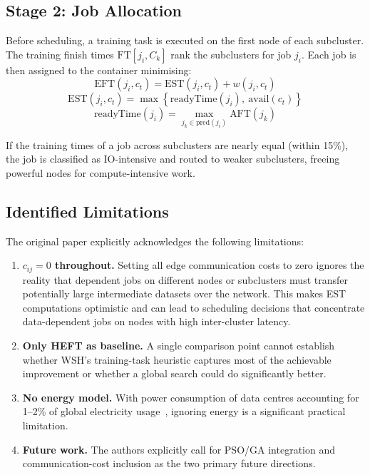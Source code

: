 \documentclass[10pt,twocolumn]{article}
\begin{document}
\subsection{Stage 2: Job Allocation}

Before scheduling, a training task is executed on the first node of each subcluster.
The training finish times $\text{FT}[j_i, C_k]$ rank the subclusters for job $j_i$.
Each job is then assigned to the container minimising:
\begin{equation}
    \text{EFT}(j_i, c_t) = \text{EST}(j_i, c_t) + w(j_i, c_t)
    \label{eq:orig_eft}
\end{equation}
\begin{equation}
    \text{EST}(j_i, c_t) = \max\!\left\{\text{readyTime}(j_i),\ \text{avail}(c_t)\right\}
    \label{eq:orig_est}
\end{equation}
\begin{equation}
    \text{readyTime}(j_i) = \max_{j_k \in \text{pred}(j_i)} \text{AFT}(j_k)
    \label{eq:orig_ready}
\end{equation}

If the training times of a job across subclusters are nearly equal (within 15\%),
the job is classified as IO-intensive and routed to weaker subclusters, freeing
powerful nodes for compute-intensive work.

\subsection{Identified Limitations}

The original paper explicitly acknowledges the following limitations:

\begin{enumerate}[leftmargin=1.3cm,label=(\roman*),topsep=2pt,itemsep=1pt]
  \item \textbf{$c_{ij} = 0$ throughout.} Setting all edge communication costs to
        zero ignores the reality that dependent jobs on different nodes or subclusters
        must transfer potentially large intermediate datasets over the network. This
        makes EST computations optimistic and can lead to scheduling decisions that
        concentrate data-dependent jobs on nodes with high inter-cluster latency.
  \item \textbf{Only HEFT as baseline.} A single comparison point cannot establish
        whether WSH's training-task heuristic captures most of the achievable
        improvement or whether a global search could do significantly better.
  \item \textbf{No energy model.} With power consumption of data centres accounting
        for 1--2\% of global electricity usage~\cite{wang2024}, ignoring energy is a
        significant practical limitation.
  \item \textbf{Future work.} The authors explicitly call for PSO/GA integration and
        communication-cost inclusion as the two primary future directions.
\end{enumerate}
\end{document}
